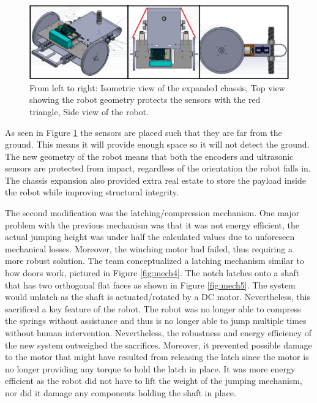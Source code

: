 \documentclass[ece]{uw-wkrpt}
\begin{document}
\begin{figure}[!htb]
    \centering
      \captionsetup{justification=centering}
    \includegraphics[width=5.5in]{res/mech3}
    \caption[Different views of final design]
          {From left to right: Isometric view of the expanded chassis, Top view showing the robot geometry protects the sensors with the red triangle, Side view of the robot.}
    \label{fig:mech3}
\end{figure}

As seen in Figure \ref{fig:mech3} the sensors are placed such that they are far from the ground. This means it will provide enough space so it will not detect the ground. The new geometry of the robot means that both the encoders and ultrasonic sensors are protected from impact, regardless of the orientation the robot falls in. The chassis expansion also provided extra real estate to store the payload inside the robot while improving structural integrity.

The second modification was the latching/compression mechanism. One major problem with the previous mechanism was that it was not energy efficient, the actual jumping height was under half the calculated values due to unforeseen mechanical losses. Moreover, the winching motor had failed, thus requiring a more robust solution. The team conceptualized a latching mechanism similar to how doors work, pictured in Figure \ref{fig:mech4}. The notch latches onto a shaft that has two orthogonal flat faces as shown in Figure \ref{fig:mech5}. The system would unlatch as the shaft is actuated/rotated by a DC motor. Nevertheless, this sacrificed a key feature of the robot. The robot was no longer able to compress the springs without assistance and thus is no longer able to jump multiple times without human intervention. Nevertheless, the robustness and energy efficiency of the new system outweighed the sacrifices. Moreover, it prevented possible damage to the motor that might have resulted from releasing the latch since the motor is no longer providing any torque to hold the latch in place. It was more energy efficient as the robot did not have to lift the weight of the jumping mechanism, nor did it damage any components holding the shaft in place. 
\end{document}
